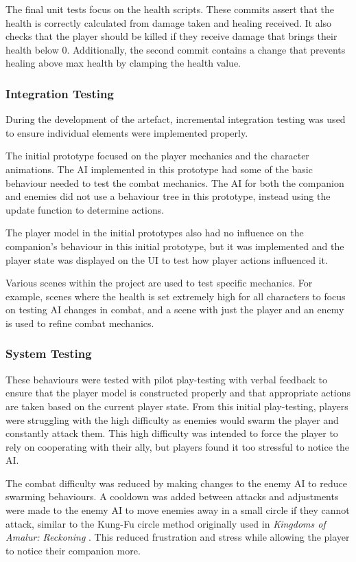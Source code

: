 \documentclass{IEEEtran}
\begin{document}
The final unit tests focus on the health scripts. These commits assert that the health is correctly calculated from damage taken and healing received. It also checks that the player should be killed if they receive damage that brings their health below 0. Additionally, the second commit contains a change that prevents healing above max health by clamping the health value.

\subsubsection{Integration Testing}

During the development of the artefact, incremental integration testing was used to ensure individual elements were implemented properly.

The initial prototype focused on the player mechanics and the character animations. The AI implemented in this prototype had some of the basic behaviour needed to test the combat mechanics. The AI for both the companion and enemies did not use a behaviour tree in this prototype, instead using the update function to determine actions.

The player model in the initial prototypes also had no influence on the companion's behaviour in this initial prototype, but it was implemented and the player state was displayed on the UI to test how player actions influenced it.

Various scenes within the project are used to test specific mechanics. For example, scenes where the health is set extremely high for all characters to focus on testing AI changes in combat, and a scene with just the player and an enemy is used to refine combat mechanics.

\subsubsection{System Testing}

These behaviours were tested with pilot play-testing with verbal feedback to ensure that the player model is constructed properly and that appropriate actions are taken based on the current player state. From this initial play-testing, players were struggling with the high difficulty as enemies would swarm the player and constantly attack them. This high difficulty was intended to force the player to rely on cooperating with their ally, but players found it too stressful to notice the AI.

The combat difficulty was reduced by making changes to the enemy AI to reduce swarming behaviours. A cooldown was added between attacks and adjustments were made to the enemy AI to move enemies away in a small circle if they cannot attack, similar to the Kung-Fu circle method originally used in \textit{Kingdoms of Amalur: Reckoning} \cite{GAIPKungFuCircle}. This reduced frustration and stress while allowing the player to notice their companion more.
\end{document}
